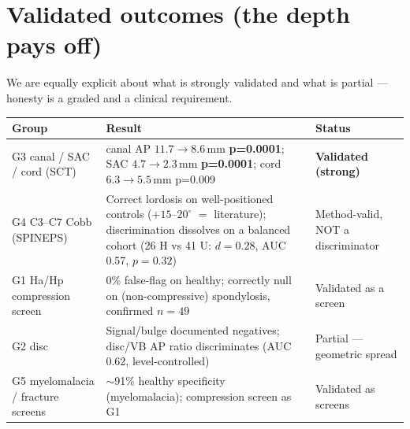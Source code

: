\documentclass[11pt]{article}
\begin{document}
\section{Validated outcomes (the depth pays off)}
We are equally explicit about what is strongly validated and what is partial --- honesty is a graded and
a clinical requirement.

\begin{table}[h]
\centering\small
\begin{tabularx}{\textwidth}{@{}l Y l@{}}
\toprule
\textbf{Group} & \textbf{Result} & \textbf{Status} \\
\midrule
G3 canal / SAC / cord (SCT) & canal AP $11.7\!\to\!8.6$\,mm \textbf{p=0.0001}; SAC $4.7\!\to\!2.3$\,mm
\textbf{p=0.0001}; cord $6.3\!\to\!5.5$\,mm p=0.009 & \textbf{Validated (strong)} \\
G4 C3--C7 Cobb (SPINEPS) & Correct lordosis on well-positioned controls ($+15$--$20^\circ$ $=$
literature); discrimination dissolves on a balanced cohort (26 H vs 41 U: $d=0.28$, AUC 0.57, $p=0.32$) &
Method-valid, NOT a discriminator \\
G1 Ha/Hp compression screen & 0\% false-flag on healthy; correctly null on (non-compressive)
spondylosis, confirmed $n=49$ & Validated as a screen \\
G2 disc & Signal/bulge documented negatives; disc/VB AP ratio discriminates (AUC 0.62, level-controlled)
& Partial --- geometric spread \\
G5 myelomalacia / fracture screens & $\sim$91\% healthy specificity (myelomalacia); compression screen
as G1 & Validated as screens \\
\bottomrule
\end{tabularx}
\end{table}

\end{document}
